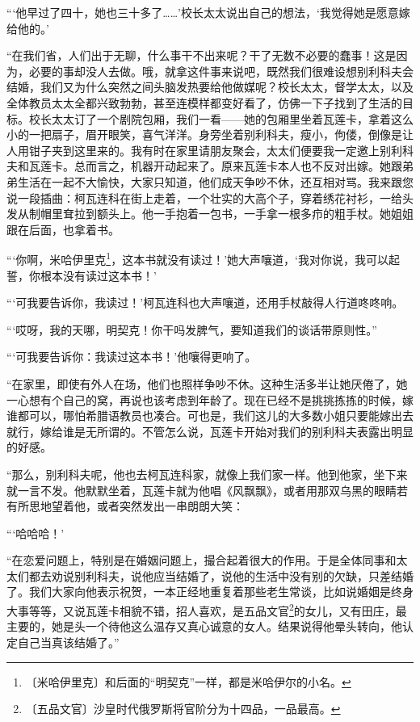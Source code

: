 \documentclass[12pt,UTF-8,openany]{ctexbook}
\begin{document}
\begin{large}
    “‘他早过了四十，她也三十多了……’校长太太说出自己的想法，‘我觉得她是愿意嫁给他的。’
    
    “在我们省，人们出于无聊，什么事干不出来呢？干了无数不必要的蠢事！这是因为，必要的事却没人去做。哦，就拿这件事来说吧，既然我们很难设想别利科夫会结婚，我们又为什么突然之间头脑发热要给他做媒呢？校长太太，督学太太，以及全体教员太太全都兴致勃勃，甚至连模样都变好看了，仿佛一下子找到了生活的目标。校长太太订了一个剧院包厢，我们一看——她的包厢里坐着瓦莲卡，拿着这么小的一把扇子，眉开眼笑，喜气洋洋。身旁坐着别利科夫，瘦小，佝偻，倒像是让人用钳子夹到这里来的。我有时在家里请朋友聚会，太太们便要我一定邀上别利科夫和瓦莲卡。总而言之，机器开动起来了。原来瓦莲卡本人也不反对出嫁。她跟弟弟生活在一起不大愉快，大家只知道，他们成天争吵不休，还互相对骂。我来跟您说一段插曲：柯瓦连科在街上走着，一个壮实的大高个子，穿着绣花衬衫，一给头发从制帽里耷拉到额头上。他一手抱着一包书，一手拿一根多疖的粗手杖。她姐姐跟在后面，也拿着书。
    
    “‘你啊，米哈伊里克\footnote{〔米哈伊里克〕和后面的“明契克”一样，都是米哈伊尔的小名。}，这本书就没有读过！’她大声嚷道，‘我对你说，我可以起誓，你根本没有读过这本书！’
    
    “‘可我要告诉你，我读过！’柯瓦连科也大声嚷道，还用手杖敲得人行道咚咚响。
    
    “‘哎呀，我的天哪，明契克！你干吗发脾气，要知道我们的谈话带原则性。”
    
    “‘可我要告诉你：我读过这本书！’他嚷得更响了。
    
    “在家里，即使有外人在场，他们也照样争吵不休。这种生活多半让她厌倦了，她一心想有个自己的窝，再说也该考虑到年龄了。现在已经不是挑挑拣拣的时候，嫁谁都可以，哪怕希腊语教员也凑合。可也是，我们这儿的大多数小姐只要能嫁出去就行，嫁给谁是无所谓的。不管怎么说，瓦莲卡开始对我们的别利科夫表露出明显的好感。
    
    “那么，别利科夫呢，他也去柯瓦连科家，就像上我们家一样。他到他家，坐下来就一言不发。他默默坐着，瓦莲卡就为他唱《风飘飘》，或者用那双乌黑的眼睛若有所思地望着他，或者突然发出一串朗朗大笑：
    
    “‘哈哈哈！’
    
    “在恋爱问题上，特别是在婚姻问题上，撮合起着很大的作用。于是全体同事和太太们都去劝说别利科夫，说他应当结婚了，说他的生活中没有别的欠缺，只差结婚了。我们大家向他表示祝贺，一本正经地重复着那些老生常谈，比如说婚姻是终身大事等等，又说瓦莲卡相貌不错，招人喜欢，是五品文官\footnote{〔五品文官〕沙皇时代俄罗斯将官阶分为十四品，一品最高。}的女儿，又有田庄，最主要的，她是头一个待他这么温存又真心诚意的女人。结果说得他晕头转向，他认定自己当真该结婚了。”
    

\end{large}
\end{document}
